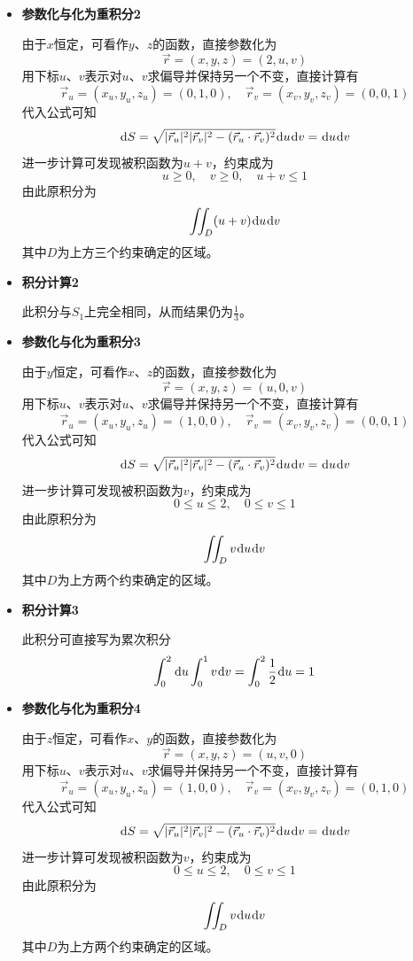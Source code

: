 \documentclass[a4paper,UTF8,fontset=windows,AutoFakeBold]{ctexart}
\newcommand*{\dr}{\hspace{0.07em}\mathrm{d}}
\newcommand*{\rv}{\vec{r}}
\theoremstyle{ex}
\begin{document}
\begin{enumerate}
{\begin{itemize}
            \item \textbf{参数化与化为重积分2}
            
            由于$x$恒定，可看作$y$、$z$的函数，直接参数化为
            $$\rv=(x,y,z)=(2,u,v)$$
            用下标$u$、$v$表示对$u$、$v$求偏导并保持另一个不变，直接计算有
            $$\rv_u=(x_u,y_u,z_u)=(0,1,0),\quad\rv_v=(x_v,y_v,z_v)=(0,0,1)$$
            代入公式可知
            $$\dr S=\sqrt{|\rv_u|^2|\rv_v|^2-(\rv_u\cdot\rv_v)^2}\dr u\dr v=\dr u\dr v$$
            进一步计算可发现被积函数为$u+v$，约束成为
            $$u\ge0,\quad v\ge0,\quad u+v\le1$$
            由此原积分为
            $$\iint_D(u+v)\dr u\dr v$$
            其中$D$为上方三个约束确定的区域。
            
            \item \textbf{积分计算2}
            
            此积分与$S_1$上完全相同，从而结果仍为$\frac{1}{3}$。
            
            \item \textbf{参数化与化为重积分3}     
            
            由于$y$恒定，可看作$x$、$z$的函数，直接参数化为
            $$\rv=(x,y,z)=(u,0,v)$$
            用下标$u$、$v$表示对$u$、$v$求偏导并保持另一个不变，直接计算有
            $$\rv_u=(x_u,y_u,z_u)=(1,0,0),\quad\rv_v=(x_v,y_v,z_v)=(0,0,1)$$
            代入公式可知
            $$\dr S=\sqrt{|\rv_u|^2|\rv_v|^2-(\rv_u\cdot\rv_v)^2}\dr u\dr v=\dr u\dr v$$
            进一步计算可发现被积函数为$v$，约束成为
            $$0\le u\le 2,\quad 0\le v\le1$$
            由此原积分为
            $$\iint_Dv\dr u\dr v$$
            其中$D$为上方两个约束确定的区域。
            
            \item \textbf{积分计算3}
            
            此积分可直接写为累次积分
            $$\int_0^2\dr u\int_0^1v\dr v=\int_0^2\frac{1}{2}\dr u=1$$
            
            \item \textbf{参数化与化为重积分4}
            
            由于$z$恒定，可看作$x$、$y$的函数，直接参数化为
            $$\rv=(x,y,z)=(u,v,0)$$
            用下标$u$、$v$表示对$u$、$v$求偏导并保持另一个不变，直接计算有
            $$\rv_u=(x_u,y_u,z_u)=(1,0,0),\quad\rv_v=(x_v,y_v,z_v)=(0,1,0)$$
            代入公式可知
            $$\dr S=\sqrt{|\rv_u|^2|\rv_v|^2-(\rv_u\cdot\rv_v)^2}\dr u\dr v=\dr u\dr v$$
            进一步计算可发现被积函数为$v$，约束成为
            $$0\le u\le 2,\quad 0\le v\le1$$
            由此原积分为
            $$\iint_Dv\dr u\dr v$$
            其中$D$为上方两个约束确定的区域。
            

\end{itemize}}
\end{enumerate}
\end{document}
